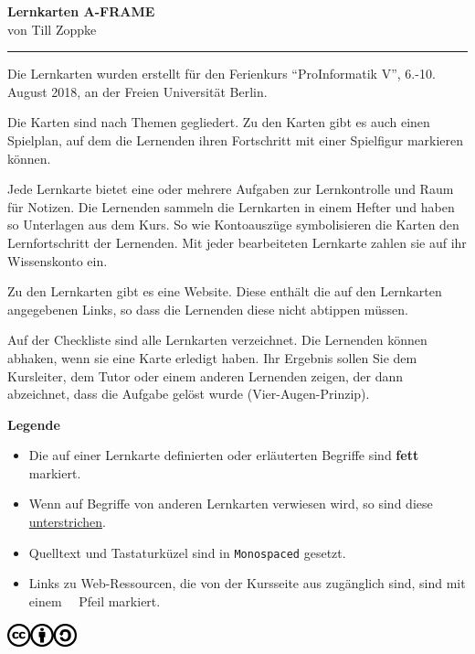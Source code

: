 \documentclass [ngerman,11pt]{article}
\def\faArrow{\FA\symbol{"F0A9}\normalfont~}
\begin{document}
\begin{center}
{\bfseries\sffamily \Large\bf Lernkarten A-FRAME}\\[2mm]
von Till Zoppke

\end{center}
\hrule
\medskip

Die Lernkarten wurden erstellt für den Ferienkurs ``ProInformatik V'', 6.-10. August 2018, an der Freien Universität Berlin.

Die Karten sind nach Themen gegliedert. Zu den Karten gibt es auch einen Spielplan, auf dem die Lernenden ihren Fortschritt mit einer Spielfigur markieren können.

Jede Lernkarte bietet eine oder mehrere Aufgaben zur Lernkontrolle und Raum für Notizen. Die Lernenden sammeln die Lernkarten in einem Hefter und haben so Unterlagen aus dem Kurs. So wie Kontoauszüge symbolisieren die Karten den Lernfortschritt der Lernenden. Mit jeder bearbeiteten Lernkarte zahlen sie auf ihr Wissenskonto ein.

Zu den Lernkarten gibt es eine Website. Diese enthält die auf den Lernkarten angegebenen Links, so dass die Lernenden diese nicht abtippen müssen.

Auf der Checkliste sind alle Lernkarten verzeichnet. Die Lernenden können abhaken, wenn sie eine Karte erledigt haben. Ihr Ergebnis sollen Sie dem Kursleiter, dem Tutor oder einem anderen Lernenden zeigen, der dann abzeichnet, dass die Aufgabe gelöst wurde (Vier-Augen-Prinzip).

{\bfseries\large Legende}\\
\begin{itemize}
\item Die auf einer Lernkarte definierten oder erläuterten Begriffe sind {\bfseries fett} markiert.
\item Wenn auf Begriffe von anderen Lernkarten verwiesen wird, so sind diese \underline{unterstrichen}.
\item Quelltext und Tastaturküzel sind in \texttt{Monospaced} gesetzt.
\item Links zu Web-Ressourcen, die von der Kursseite aus zugänglich sind, sind mit einem \faArrow\normalfont~Pfeil markiert.
\end{itemize}

\vfill
\includegraphics[width=2cm]{CC-BY-SA}
\pagebreak

\end{document}
